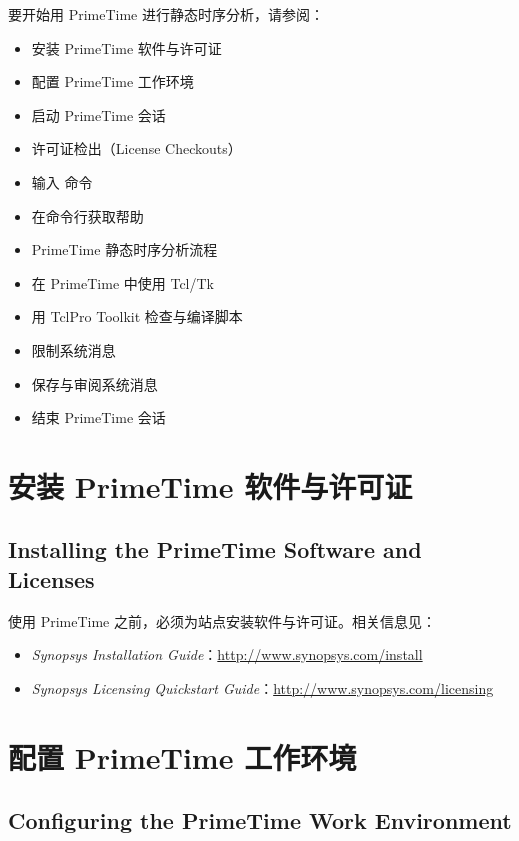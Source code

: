 \label{chap:start}

要开始用 PrimeTime 进行静态时序分析，请参阅：
\begin{itemize}
  \item 安装 PrimeTime 软件与许可证
  \item 配置 PrimeTime 工作环境
  \item 启动 PrimeTime 会话
  \item 许可证检出（License Checkouts）
  \item 输入  命令
  \item 在命令行获取帮助
  \item PrimeTime 静态时序分析流程
  \item 在 PrimeTime 中使用 Tcl/Tk
  \item 用 TclPro Toolkit 检查与编译脚本
  \item 限制系统消息
  \item 保存与审阅系统消息
  \item 结束 PrimeTime 会话
\end{itemize}

\section{安装 PrimeTime 软件与许可证}
\subsection*{Installing the PrimeTime Software and Licenses}

使用 PrimeTime 之前，必须为站点安装软件与许可证。相关信息见：
\begin{itemize}
  \item \textit{Synopsys Installation Guide}：\url{http://www.synopsys.com/install}
  \item \textit{Synopsys Licensing Quickstart Guide}：\url{http://www.synopsys.com/licensing}
\end{itemize}

\section{配置 PrimeTime 工作环境}
\subsection*{Configuring the PrimeTime Work Environment}

